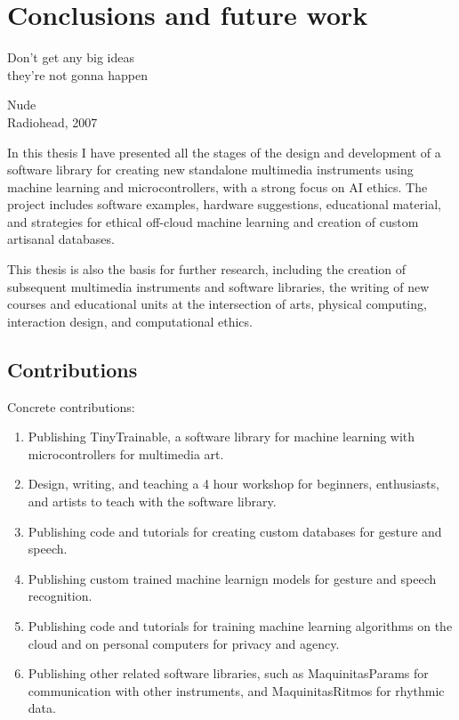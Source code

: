 \chapter{Conclusions and future work}

\epigraph{Don't get any big ideas \\ they're not gonna happen}{Nude \\ Radiohead, 2007}

In this thesis I have presented all the stages of the design and development of a software library for creating new standalone multimedia instruments using machine learning and microcontrollers, with a strong focus on AI ethics. The project includes software examples, hardware suggestions, educational material, and strategies for ethical off-cloud machine learning and creation of custom artisanal databases.

This thesis is also the basis for further research, including the creation of subsequent multimedia instruments and software libraries, the writing of new courses and educational units at the intersection of arts, physical computing, interaction design, and computational ethics.

\section{Contributions}

Concrete contributions:

\begin{enumerate}
  \item Publishing TinyTrainable, a software library for machine learning with microcontrollers for multimedia art.
  \item Design, writing, and teaching a 4 hour workshop for beginners, enthusiasts, and artists to teach with the software library.
  \item Publishing code and tutorials for creating custom databases for gesture and speech.
  \item Publishing custom trained machine learnign models for gesture and speech recognition.
  \item Publishing code and tutorials for training machine learning algorithms on the cloud and on personal computers for privacy and agency.
  \item Publishing other related software libraries, such as MaquinitasParams for communication with other instruments, and MaquinitasRitmos for rhythmic data.
\end{enumerate}

